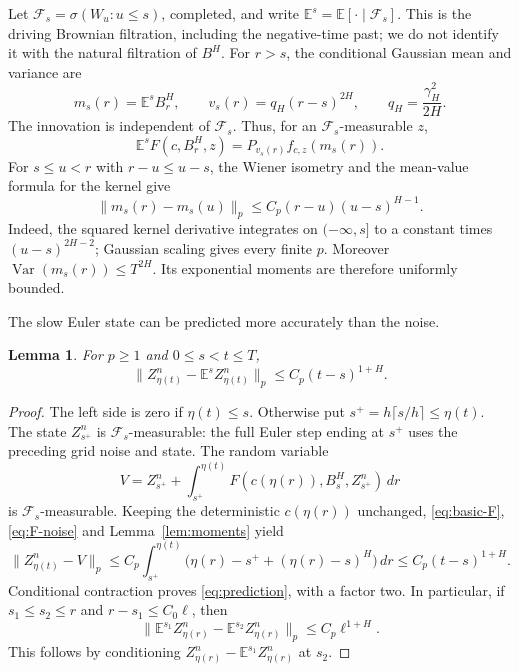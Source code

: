 \documentclass[11pt]{article}
\newtheorem{lemma}[theorem]{Lemma}
\theoremstyle{remark}
\newcommand{\E}{\mathbb E}
\newcommand{\F}{\mathcal F}
\newcommand{\norm}[1]{\lVert#1\rVert}
\begin{document}
Let \(\F_s=\sigma(W_u:u\le s)\), completed, and write
\(\E^s=\E[\cdot\mid\F_s]\).
This is the driving Brownian filtration, including the negative-time past;
we do not identify it with the natural filtration of \(B^H\).
For \(r>s\), the conditional Gaussian mean and variance are
\[
 m_s(r)=\E^s B^H_r,\qquad
 v_s(r)=q_H(r-s)^{2H},\qquad q_H=\frac{\gamma_H^2}{2H}.
\]
The innovation is independent of \(\F_s\). Thus, for an
\(\F_s\)-measurable \(z\),
\begin{equation}\label{eq:conditional-heat}
 \E^s F(c,B^H_r,z)=P_{v_s(r)}f_{c,z}(m_s(r)).
\end{equation}
For \(s\le u<r\) with \(r-u\le u-s\), the Wiener isometry and the
mean-value formula for the kernel give
\begin{equation}\label{eq:conditional-mean}
 \norm{m_s(r)-m_s(u)}_p
 \le C_p(r-u)(u-s)^{H-1}.
\end{equation}
Indeed, the squared kernel derivative integrates on \((-\infty,s]\)
to a constant times \((u-s)^{2H-2}\); Gaussian scaling gives every
finite \(p\). Moreover \(\operatorname{Var}(m_s(r))\le T^{2H}\).
Its exponential moments are therefore uniformly bounded.

The slow Euler state can be predicted more accurately than the noise.

\begin{lemma}\label{lem:prediction}
For \(p\ge1\) and \(0\le s<t\le T\),
\begin{equation}\label{eq:prediction}
 \norm{Z^n_{\eta(t)}-\E^s Z^n_{\eta(t)}}_p
 \le C_p(t-s)^{1+H}.
\end{equation}
\end{lemma}
\begin{proof}
The left side is zero if \(\eta(t)\le s\).
Otherwise put \(s^+=h\lceil s/h\rceil\le\eta(t)\).
The state \(Z^n_{s^+}\) is \(\F_s\)-measurable: the full Euler step
ending at \(s^+\) uses the preceding grid noise and state.
The random variable
\[
 V=Z^n_{s^+}+
       \int_{s^+}^{\eta(t)}F(c(\eta(r)),B^H_s,Z^n_{s^+})\,dr
\]
is \(\F_s\)-measurable. Keeping the deterministic \(c(\eta(r))\)
unchanged, \eqref{eq:basic-F}, \eqref{eq:F-noise} and
Lemma~\ref{lem:moments} yield
\[
 \norm{Z^n_{\eta(t)}-V}_p
 \le C_p\int_{s^+}^{\eta(t)}
       \bigl(\eta(r)-s^++(\eta(r)-s)^H\bigr)\,dr
 \le C_p(t-s)^{1+H}.
\]
Conditional contraction proves \eqref{eq:prediction}, with a factor two.
In particular, if \(s_1\le s_2\le r\) and \(r-s_1\le C_0\ell\), then
\begin{equation}\label{eq:prediction-difference}
 \norm{\E^{s_1}Z^n_{\eta(r)}-\E^{s_2}Z^n_{\eta(r)}}_p
 \le C_p\ell^{1+H}.
\end{equation}
This follows by conditioning \(Z^n_{\eta(r)}-\E^{s_1}Z^n_{\eta(r)}\)
at \(s_2\).
\end{proof}
\end{document}
